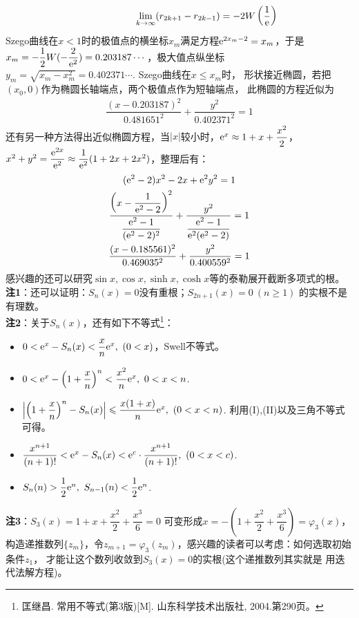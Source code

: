 \begin{enumerate}[label={【\textbf{例\thechapter.\arabic*}】},
 leftmargin=\inteval{\myenumleftmargin}pt,
 itemsep=\inteval{\myenumitempsep}pt,
 itemindent=\inteval{\myenumitemindent}pt]
\begin{align*}
    \hspace{2cm}  \lim_{k\to \infty}(r_{2k+1}-r_{2k-1})
    =-2W\left(\dfrac{1}{\mathrm{e}}\right)
\end{align*}
Szego曲线在$ x<1 $时的极值点的横坐标$ x_m $满足方程$ \mathrm{e}^{2x_m-2}=x_m $，于是
$ x_m=-\dfrac{1}{2}W(-\dfrac{2}{\mathrm{e}^2})=0.203187\cdots $，极大值点纵坐标
$ y_m=\sqrt{x_m-x_m^2}=0.402371\cdots $. Szego曲线在$ x\leq x_m $时，
形状接近椭圆，若把$ (x_0,0) $作为椭圆长轴端点，两个极值点作为短轴端点，
此椭圆的方程近似为
\begin{align*}
    \dfrac{(x-0.203187)^2}{0.481651^2}+\dfrac{y^2}{0.402371^2}=1
\end{align*}
还有另一种方法得出近似椭圆方程，当$ |x| $较小时，$ \mathrm{e}^x\approx 1+x+
\dfrac{x^2}{2} $，
$ x^2+y^2=\dfrac{\mathrm{e}^{2x}}{\mathrm{e}^2}\approx\dfrac{1}{\mathrm{e}^2}(1+2x+2x^2) $，整理后有：
\begin{gather*}
    (\mathrm{e}^2-2)x^2-2x+\mathrm{e}^2y^2=1 \\
    \dfrac{\left(x-\dfrac{1}{\mathrm{e}^2-2}\right)^2}{\dfrac{\mathrm{e}^2-1}{(\mathrm{e}^2-2)^2}}+
    \dfrac{y^2}{\dfrac{\mathrm{e}^2-1}{\mathrm{e}^2(\mathrm{e}^2-2)}}=1 \\
    \dfrac{(x-0.185561)^2}{0.469035^2}+\dfrac{y^2}{0.400559^2}=1
\end{gather*}
感兴趣的还可以研究$ \sin x,\cos x,\sinh x,\cosh x $等的泰勒展开截断多项式的根。\\
\textbf{注1}：还可以证明：$ S_n(x)=0 $没有重根；$ S_{2n+1}(x)=0\ (n\geq 1) $
的实根不是有理数。\\
\textbf{注2}：关于$ S_n(x) $，还有如下不等式\footnote{匡继昌. 
    常用不等式(第3版)[M]. 山东科学技术出版社, 2004.第290页。}：
\begin{itemize}
\item $ 0<\e^x-S_n(x)<\dfrac{x}{n}\e^x,\ (0<x) $，Swell不等式。
\item $ 0<\mathrm{e}^x-\left(1+\dfrac{x}{n}\right)^n<\dfrac{x^2}{n}\mathrm{e}^x,
\ 0<x<n $.
\item $ \left|\left(1+\dfrac{x}{n}\right)^n-S_n(x)\right|
\leqslant \dfrac{x(1+x)}{n}\mathrm{e}^x,\ (0<x<n) $. 利用(I),(II)以及三角不等式可得。
\item $ \dfrac{x^{n+1}}{(n+1)!}<\mathrm{e}^x-S_n(x)<\mathrm{e}^c \cdot \dfrac{x^{n+1}}
{(n+1)!},\ (0<x<c) $.
\item $ S_n(n)>\dfrac{1}{2}\e^n,\ S_{n-1}(n)<\dfrac{1}{2}\e^n $.
\end{itemize}
\textbf{注3}：$ S_3(x)=1+x+\dfrac{x^2}{2}+\dfrac{x^3}{6}=0 $
可变形成$ x=-\left(1+\dfrac{x^2}{2}+\dfrac{x^3}{6}\right)=
\varphi_3(x) $，构造递推数列$ \{z_m\} $，令$ z_{m+1}=
\varphi_3(z_m) $，感兴趣的读者可以考虑：如何选取初始条件$ z_1 $，
才能让这个数列收敛到$ S_3(x)=0 $的实根(这个递推数列其实就是
用迭代法解方程)。


\end{enumerate}
